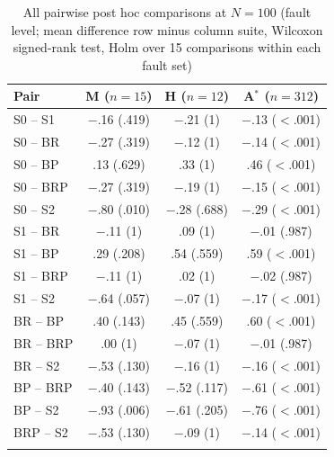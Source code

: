 \begin{table}[t]
\caption{All pairwise post hoc comparisons at $N=100$ (fault level; mean difference row minus column suite, Wilcoxon signed-rank test, Holm over 15 comparisons within each fault set)}
\label{tab:pairs}
\footnotesize
\setlength{\tabcolsep}{3pt}
\begin{tabular}{@{}lccc@{}}
\toprule
Pair & M ($n=15$) & H ($n=12$) & A$^{*}$ ($n=312$) \\
\midrule
S0 -- S1 & $-$.16 (.419) & $-$.21 (1) & $-$.13 ($<$.001) \\
S0 -- BR & $-$.27 (.319) & $-$.12 (1) & $-$.14 ($<$.001) \\
S0 -- BP & .13 (.629) & .33 (1) & .46 ($<$.001) \\
S0 -- BRP & $-$.27 (.319) & $-$.19 (1) & $-$.15 ($<$.001) \\
S0 -- S2 & $-$.80 (.010) & $-$.28 (.688) & $-$.29 ($<$.001) \\
S1 -- BR & $-$.11 (1) & .09 (1) & $-$.01 (.987) \\
S1 -- BP & .29 (.208) & .54 (.559) & .59 ($<$.001) \\
S1 -- BRP & $-$.11 (1) & .02 (1) & $-$.02 (.987) \\
S1 -- S2 & $-$.64 (.057) & $-$.07 (1) & $-$.17 ($<$.001) \\
BR -- BP & .40 (.143) & .45 (.559) & .60 ($<$.001) \\
BR -- BRP & .00 (1) & $-$.07 (1) & $-$.01 (.987) \\
BR -- S2 & $-$.53 (.130) & $-$.16 (1) & $-$.16 ($<$.001) \\
BP -- BRP & $-$.40 (.143) & $-$.52 (.117) & $-$.61 ($<$.001) \\
BP -- S2 & $-$.93 (.006) & $-$.61 (.205) & $-$.76 ($<$.001) \\
BRP -- S2 & $-$.53 (.130) & $-$.09 (1) & $-$.14 ($<$.001) \\
\botrule
\end{tabular}
\end{table}
